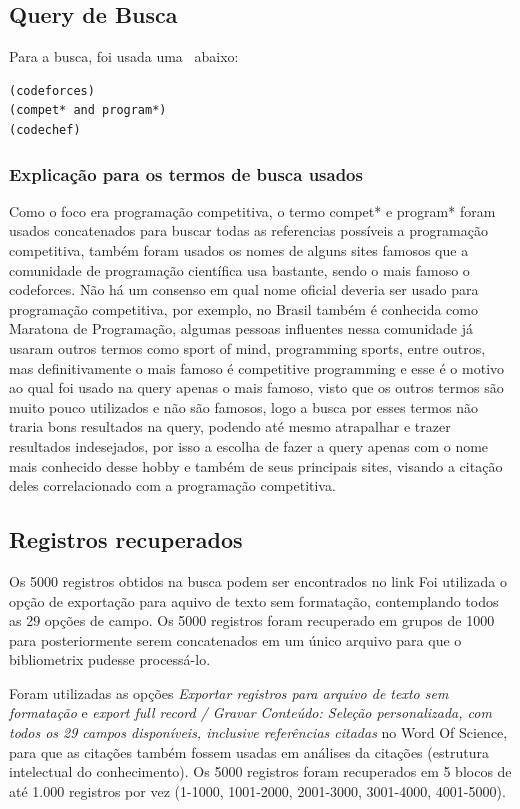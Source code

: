 \subsection{Query de Busca}

Para a busca, foi usada uma \query\ abaixo:
\begin{verbatim}
(codeforces)
(compet* and program*)
(codechef)
\end{verbatim}

\subsubsection{Explicação para os termos de busca usados}

Como o foco era programação competitiva, o termo compet* e program* foram usados concatenados para buscar todas as referencias possíveis a programação competitiva, também foram usados os nomes de alguns sites famosos que a comunidade de programação científica usa bastante, sendo o mais famoso o codeforces. Não há um consenso em qual nome oficial deveria ser usado para programação competitiva, por exemplo, no Brasil também é conhecida como Maratona de Programação, algumas pessoas influentes nessa comunidade já usaram outros termos como sport of mind, programming sports, entre outros, mas definitivamente o mais famoso é competitive programming e esse é o motivo ao qual foi usado na query apenas o mais famoso, visto que os outros termos são muito pouco utilizados e não são famosos, logo a busca por esses termos não traria bons resultados na query, podendo até mesmo atrapalhar e trazer resultados indesejados, por isso a escolha de fazer a query apenas com o nome mais conhecido desse hobby e também de seus principais sites, visando a citação deles correlacionado com a programação competitiva.

\subsection{Registros recuperados}

Os 5000 registros obtidos na busca podem ser encontrados no link \url{}
Foi utilizada o opção de exportação para aquivo de texto sem formatação, contemplando todos as 29 opções de campo. Os 5000 registros foram recuperado em grupos de 1000 para posteriormente serem concatenados em um único arquivo para que o bibliometrix pudesse processá-lo.

Foram utilizadas as opções \textit{Exportar registros para arquivo de texto sem formatação} e \textit{export full record / Gravar Conteúdo: Seleção personalizada, com todos os 29 campos disponíveis, inclusive referências citadas} no Word Of Science, para que as citações também fossem usadas em análises da citações (estrutura intelectual do conhecimento). Os 5000 registros foram recuperados em 5 blocos de até 1.000 registros por vez (1-1000, 1001-2000, 2001-3000, 3001-4000, 4001-5000).

